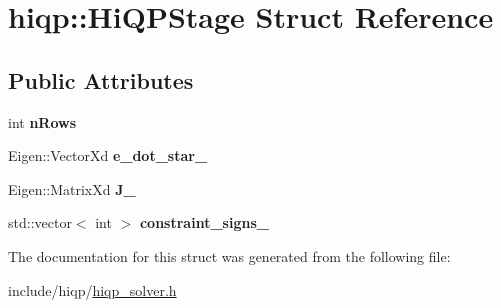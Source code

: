 \hypertarget{structhiqp_1_1HiQPStage}{\section{hiqp\-:\-:Hi\-Q\-P\-Stage Struct Reference}
\label{structhiqp_1_1HiQPStage}
}
\subsection*{Public Attributes}
\begin{DoxyCompactItemize}
\item 
\hypertarget{structhiqp_1_1HiQPStage_a058c2644d6b88fe475411fa8d41a860a}{int {\bfseries n\-Rows}}\label{structhiqp_1_1HiQPStage_a058c2644d6b88fe475411fa8d41a860a}

\item 
\hypertarget{structhiqp_1_1HiQPStage_a3e3f1a95221f1f46b9448e133089125d}{Eigen\-::\-Vector\-Xd {\bfseries e\-\_\-dot\-\_\-star\-\_\-}}\label{structhiqp_1_1HiQPStage_a3e3f1a95221f1f46b9448e133089125d}

\item 
\hypertarget{structhiqp_1_1HiQPStage_afcbf16c4621fdc0144c30e4517b63d43}{Eigen\-::\-Matrix\-Xd {\bfseries J\-\_\-}}\label{structhiqp_1_1HiQPStage_afcbf16c4621fdc0144c30e4517b63d43}

\item 
\hypertarget{structhiqp_1_1HiQPStage_a61ec5b733229b042dd2fafdd87acba90}{std\-::vector$<$ int $>$ {\bfseries constraint\-\_\-signs\-\_\-}}\label{structhiqp_1_1HiQPStage_a61ec5b733229b042dd2fafdd87acba90}

\end{DoxyCompactItemize}


The documentation for this struct was generated from the following file\-:\begin{DoxyCompactItemize}
\item 
include/hiqp/\hyperlink{hiqp__solver_8h}{hiqp\-\_\-solver.\-h}\end{DoxyCompactItemize}
